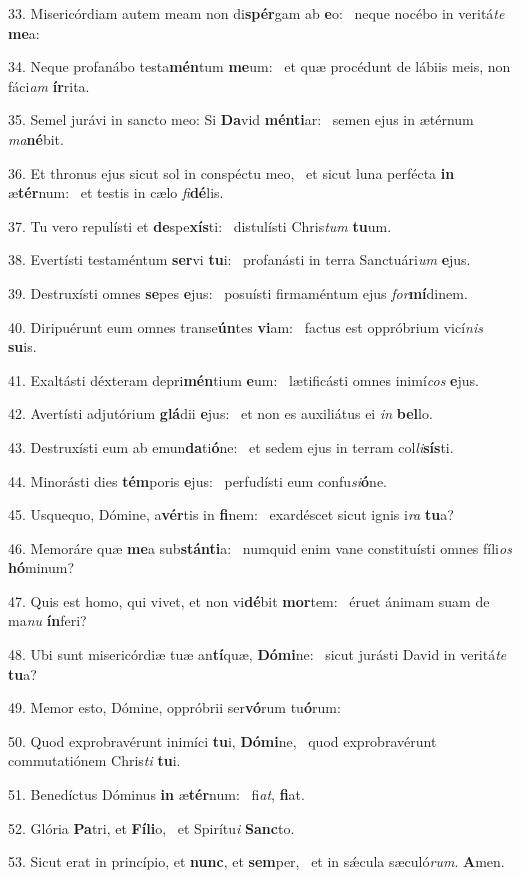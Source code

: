 33. Misericórdiam autem meam non di\textbf{spér}gam ab \textbf{e}o: \ast\  neque nocébo in veritá\textit{te} \textbf{me}a:\

34. Neque profanábo testa\textbf{mén}tum \textbf{me}um: \ast\  et quæ procédunt de lábiis meis, non fáci\textit{am} \textbf{ír}rita.\

35. Semel jurávi in sancto meo: Si \textbf{Da}vid \textbf{mén}\textbf{ti}ar: \ast\  semen ejus in ætérnum \textit{ma}\textbf{né}bit.\

36. Et thronus ejus sicut sol in conspéctu meo, \dag\  et sicut luna perfécta \textbf{in} æ\textbf{tér}num: \ast\  et testis in cælo \textit{fi}\textbf{dé}lis.\

37. Tu vero repulísti et \textbf{de}spe\textbf{xís}ti: \ast\  distulísti Chris\textit{tum} \textbf{tu}um.\

38. Evertísti testaméntum \textbf{ser}vi \textbf{tu}i: \ast\  profanásti in terra Sanctuári\textit{um} \textbf{e}jus.\

39. Destruxísti omnes \textbf{se}pes \textbf{e}jus: \ast\  posuísti firmaméntum ejus \textit{for}\textbf{mí}dinem.\

40. Diripuérunt eum omnes transe\textbf{ún}tes \textbf{vi}am: \ast\  factus est oppróbrium vicí\textit{nis} \textbf{su}is.\

41. Exaltásti déxteram depri\textbf{mén}tium \textbf{e}um: \ast\  lætificásti omnes inimí\textit{cos} \textbf{e}jus.\

42. Avertísti adjutórium \textbf{glá}dii \textbf{e}jus: \ast\  et non es auxiliátus ei \textit{in} \textbf{bel}lo.\

43. Destruxísti eum ab emun\textbf{da}ti\textbf{ó}ne: \ast\  et sedem ejus in terram col\textit{li}\textbf{sís}ti.\

44. Minorásti dies \textbf{tém}poris \textbf{e}jus: \ast\  perfudísti eum confu\textit{si}\textbf{ó}ne.\

45. Usquequo, Dómine, a\textbf{vér}tis in \textbf{fi}nem: \ast\  exardéscet sicut ignis i\textit{ra} \textbf{tu}a?\

46. Memoráre quæ \textbf{me}a sub\textbf{stán}\textbf{ti}a: \ast\  numquid enim vane constituísti omnes fíli\textit{os} \textbf{hó}minum?\

47. Quis est homo, qui vivet, et non vi\textbf{dé}bit \textbf{mor}tem: \ast\  éruet ánimam suam de ma\textit{nu} \textbf{ín}feri?\

48. Ubi sunt misericórdiæ tuæ an\textbf{tí}quæ, \textbf{Dó}\textbf{mi}ne: \ast\  sicut jurásti David in veritá\textit{te} \textbf{tu}a?\

49. Memor esto, Dómine, oppróbrii ser\textbf{vó}rum tu\textbf{ó}rum: \ast\  \

50. Quod exprobravérunt inimíci \textbf{tu}i, \textbf{Dó}\textbf{mi}ne, \ast\  quod exprobravérunt commutatiónem Chris\textit{ti} \textbf{tu}i.\

51. Benedíctus Dóminus \textbf{in} æ\textbf{tér}num: \ast\  fi\textit{at}, \textbf{fi}at.\

52. Glória \textbf{Pa}tri, et \textbf{Fí}\textbf{li}o, \ast\  et Spirítu\textit{i} \textbf{Sanc}to.\

53. Sicut erat in princípio, et \textbf{nunc}, et \textbf{sem}per, \ast\  et in sǽcula sæculó\textit{rum}. \textbf{A}men.\

